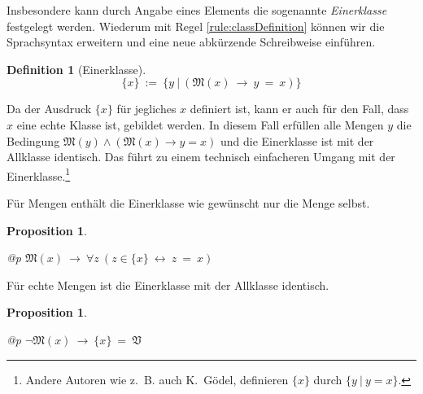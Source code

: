 \documentclass[a4paper,german,10pt,twoside]{book}
\newtheorem{prop}[thm]{Proposition}
\theoremstyle{definition}
\newtheorem{defn}[thm]{Definition}
\theoremstyle{remark}
\begin{document}
\par
Insbesondere kann durch Angabe eines Elements die sogenannte \emph{Einerklasse} 
festgelegt werden.
  Wiederum mit Regel \ref{rule:classDefinition} k{\"o}nnen wir die Sprachsyntax erweitern und eine neue abk{\"u}rzende Schreibweise einf{\"u}hren.

\begin{defn}[Einerklasse]
\label{definition:singleton} \hypertarget{definition:singleton}{}
$$\{ x \}\ := \ \{ y \ | \ (\mathfrak{M}(x)\ \rightarrow \ y \ =  \ x) \} $$

\end{defn}

Da der Ausdruck $\{x\}$ f{\"u}r jegliches $x$ definiert ist, kann er auch f{\"u}r den Fall, 
dass $x$ eine echte Klasse ist, gebildet werden. In diesem Fall erf{\"u}llen alle Mengen 
$y$ die Bedingung 
$\mathfrak{M}(y) \land (\mathfrak{M}(x) \rightarrow y = x)$ und die Einerklasse ist 
mit der Allklasse identisch. Das f{\"u}hrt zu einem technisch einfacheren Umgang mit der
Einerklasse.\footnote{Andere Autoren wie z.~B. auch K.~G{\"o}del, definieren $\{x\}$ durch
$\{y~|~y = x\}$.}


\par
F{\"u}r Mengen enth{\"a}lt die Einerklasse wie gew{\"u}nscht nur die Menge selbst.

\begin{prop}
\label{theorem:setSingletonHasSetAsOnlyElement} \hypertarget{theorem:setSingletonHasSetAsOnlyElement}{}
\mbox{}
\begin{longtable}{{@{\extracolsep{\fill}}p{\linewidth}}}
\centering $\mathfrak{M}(x)\ \rightarrow \ \forall z\ (z \in \{ x \}\ \leftrightarrow \ z \ =  \ x)$
\end{longtable}

\end{prop}




\par
F{\"u}r echte Mengen ist die Einerklasse mit der Allklasse identisch.

\begin{prop}
\label{theorem:properSingletonIsUniversalClass} \hypertarget{theorem:properSingletonIsUniversalClass}{}
\mbox{}
\begin{longtable}{{@{\extracolsep{\fill}}p{\linewidth}}}
\centering $\neg \mathfrak{M}(x)\ \rightarrow \ \{ x \} \ =  \ \mathfrak{V}$
\end{longtable}

\end{prop}
\end{document}
